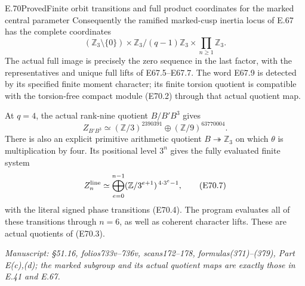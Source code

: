 \begin{statement}{E.70}{Proved}{Finite orbit transitions and full product coordinates for the marked central parameter}
Consequently the ramified marked-cusp inertia locus
of E.67 has the complete coordinates
\[
 (\mathbb Z_3\setminus\{0\})\times
       \mathbb Z_3/(q-1)\mathbb Z_3\times
                       \prod_{n\ge1}\mathbb Z_3 .
 \tag{E70.5}
\]
The actual full image is precisely the zero sequence
in the last factor, with the representatives and
unique full lifts of E67.5--E67.7.
The word E67.9 is detected by its specified finite
moment character; its finite torsion quotient is
compatible with the torsion-free compact module
(E70.2) through that actual quotient map.

At $q=4$, the actual rank-nine quotient
$B/B'B^3$ gives
\[
      Z_{B'B^3}\simeq
        (\mathbb Z/3)^{2390391}
                 \oplus(\mathbb Z/9)^{63770004}.
 \tag{E70.6}
\]
There is also an explicit primitive arithmetic
quotient $B\twoheadrightarrow\mathbb Z_3$ on which
$\theta$ is multiplication by four. Its positional
level $3^n$ gives the fully evaluated finite system
\[
      Z^{\rm line}_n\simeq
         \bigoplus_{e=0}^{n-1}
             (\mathbb Z/3^{e+1})^{\,4\cdot3^e-1},
 \tag{E70.7}
\]
with the literal signed phase transitions (E70.4).
The program evaluates all of these transitions
through $n=6$, as well as coherent character lifts.
These are actual quotients of (E70.3).

\emph{Manuscript: \S51.16, folios733v--736v,
scans172--178, formulas(371)--(379), Part E(c),(d);
the marked subgroup and its actual quotient maps
are exactly those in E.41 and E.67.}
\end{statement}

